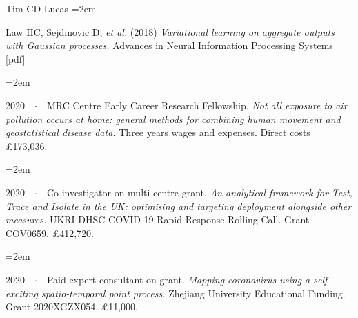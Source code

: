 \documentclass{scrartcl}
\newcommand{\MarginText}[1]{\marginpar{\raggedleft\itshape\small#1}} %
\newcommand{\Description}[1]{\hangindent=2em\hangafter=0\noindent\raggedright\footnotesize{#1}\par\normalsize\vspace{1em}} %
\begin{document}
\begin{cv}{Tim {\Large CD} Lucas}
\Description{\MarginText{2018}Law HC, Sejdinovic D, \emph{et al.} (2018) \emph{Variational learning on aggregate outputs with Gaussian processes.} Advances in Neural Information Processing Systems [\href{http://papers.nips.cc/paper/7847-variational-learning-on-aggregate-outputs-with-gaussian-processes.pdf}{pdf}]}


\vspace{1em} %





{\color{Maroon}}\vspace{1em}

\Description{2020\ \ $\cdotp$\ \ MRC Centre Early Career Research Fellowship. \emph{Not all exposure to air pollution occurs at home: general methods for combining human movement and geostatistical disease data.} Three years wages and expenses. Direct costs £173,036.}
\vspace{-0.5em} %


\Description{2020\ \ $\cdotp$\ \ Co-investigator on multi-centre grant. \emph{An analytical framework for Test, Trace and Isolate in the UK: optimising and targeting deployment alongside other measures.} UKRI-DHSC COVID-19 Rapid Response Rolling Call. Grant COV0659. £412,720.}
\vspace{-0.5em} %



\Description{2020\ \ $\cdotp$\ \ Paid expert consultant on grant. \emph{Mapping coronavirus using a self-exciting spatio-temporal point process.} Zhejiang University Educational Funding. Grant 2020XGZX054. £11,000.}
\vspace{-0.5em} %



\vspace{1em} %








{\color{Maroon}}\vspace{1em}



\end{cv}
\end{document}
